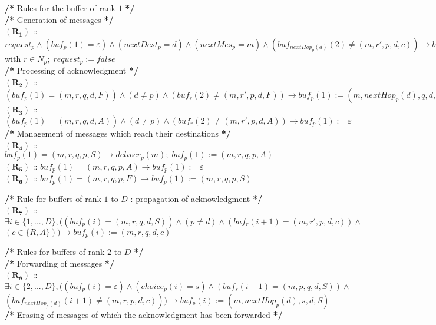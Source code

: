 \documentclass[11pt]{article}
\begin{document}
\begin{algorithm}
{\begin{description}
				\item \textbf{/*} Rules for the buffer of rank $1$ \textbf{*/}\\
					\textbf{/*} Generation of messages \textbf{*/}\\
					$\boldsymbol{(R_{1})}$ :: $request_{p} \wedge (buf_{p}(1)=\varepsilon) \wedge 
					(nextDest_{p}=d) \wedge (nextMes_{p}=m) \wedge (buf_{nextHop_{p}(d)}(2)\neq(m,r',p,d,c))
					\longrightarrow buf_{p}(1):=(m,nextHop_{p}(d),r,d,S)$ with $r\in N_{p};\;	request_{p}:=false$\\
					\textbf{/*} Processing of acknowledgment \textbf{*/}\\
					$\boldsymbol{(R_{2})}$ :: $(buf_{p}(1)=(m,r,q,d,F)) \wedge (d\neq p)
					\wedge (buf_{r}(2)\neq(m,r',p,d,F)) \longrightarrow buf_{p}(1):=(m,nextHop_{p}(d),q,d,S)$ \\
					$\boldsymbol{(R_{3})}$ :: $(buf_{p}(1)=(m,r,q,d,A)) \wedge (d\neq p) \wedge (buf_{r}(2)\neq(m,r',p,d,A)) \longrightarrow buf_{p}(1):=\varepsilon$ \\
					\textbf{/*} Management of messages which reach their destinations \textbf{*/}\\
					$\boldsymbol{(R_{4})}$ :: $buf_{p}(1)=(m,r,q,p,S)\longrightarrow deliver_{p}(m);\; buf_{p}(1):=(m,r,q,p,A)$ \\
					$\boldsymbol{(R_{5})}$ :: $buf_{p}(1)=(m,r,q,p,A)\longrightarrow buf_{p}(1):=\varepsilon$ \\
					$\boldsymbol{(R_{6})}$ :: $buf_{p}(1)=(m,r,q,p,F)\longrightarrow buf_{p}(1):=(m,r,q,p,S)$
				\item \textbf{/*} Rule for buffers of rank $1$ to $D$ : propagation of acknowledgment \textbf{*/}\\
					$\boldsymbol{(R_{7})}$ :: $\exists i\in\{1,...,D\},((buf_{p}(i)=(m,r,q,d,S)) \wedge (p\neq d) \wedge (buf_{r}(i+1)=(m,r',p,d,c)) \wedge$
					$(c\in\{R,A\})) \longrightarrow buf_{p}(i):=(m,r,q,d,c)$ 
				\item \textbf{/*} Rules for buffers of rank $2$ to $D$ \textbf{*/}\\
					\textbf{/*} Forwarding of messages \textbf{*/}\\
					$\boldsymbol{(R_{8})}$ :: $\exists i\in\{2,...,D\},( (buf_{p}(i)=\varepsilon) \wedge (choice_{p}(i)=s) \wedge (buf_{s}(i-1)=(m,p,q,d,S)) \wedge$
					$(buf_{nextHop_{p}(d)}(i+1)\neq(m,r,p,d,c))) \longrightarrow buf_{p}(i):=(m,nextHop_{p}(d),s,d,S)$\\
			\textbf{/*} Erasing of messages of which the acknowledgment has been forwarded \textbf{*/}\\

\end{description}}
\end{algorithm}
\end{document}

